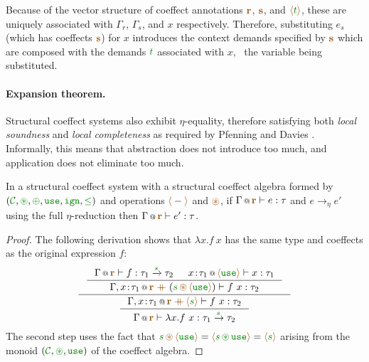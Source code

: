 \noindent
Because of the vector structure of coeffect annotations $\aclrd{\textbf{r}}$,
$\aclrd{\textbf{s}}$, and $\alift{\cclrd{t}}$, these are uniquely associated with $\Gamma_r$,
$\Gamma_s$, and $x$ respectively. Therefore, substituting $e_s$ (which has coeffects
$\aclrd{\textbf{s}}$) for $x$ introduces the context demands specified by $\aclrd{\textbf{s}}$
which are composed with the demands $\cclrd{t}$ associated with $x$, \ie~the variable being
substituted.

\paragraph{Expansion theorem.}
Structural coeffect systems also exhibit $\eta$-equality, therefore satisfying both
\emph{local soundness} and \emph{local completeness} as required by Pfenning and Davies
\cite{logic-modal-reconstruction}. Informally, this means that abstraction does not introduce
too much, and application does not eliminate too much.

\begin{theorem}
In a structural coeffect system with a structural coeffect algebra formed by
$(\C, \cseq, \cpar, \cunit, \czero, \cleq)$ and operations $\alift{-}$ and $\aseq$,
if $\coctx{\Gamma}{\aclrd{\textbf{r}}} \vdash e : \tau$
and $e \rightarrow_{\eta} e'$ using the full $\eta$-reduction then
$\coctx{\Gamma}{\aclrd{\textbf{r}}} \vdash e' : \tau$.
\end{theorem}
\begin{proof}
The following derivation shows that $\lambda x.f~x$ has the same type and coeffects as
the original expression $f$:
\begin{equation*}
\inference
  { \inference
    { \coctx{\Gamma}{\aclrd{\textbf{r}}} \vdash f : \tau_1 \xrightarrow{\cclrd{s}} \tau_2 &
      \coctx{x\!:\!\tau_1}{\alift{\cunit}} \vdash x:\tau_1 }
    { \coctx{\Gamma, x\!:\!\tau_1}{\aclrd{\textbf{r}} \;\atimes\;(\cclrd{s}\,\aseq\,\alift{\cunit}) } \vdash f~x : \tau_2 } }
  { \inference
    { \coctx{\Gamma, x\!:\!\tau_1}{\aclrd{\textbf{r}} \;\atimes\,\alift{\cclrd{s}} } \vdash f~x : \tau_2 }
    { \coctx{\Gamma}{ \aclrd{\textbf{r}} } \vdash \lambda x.f~x : \tau_1 \xrightarrow{\cclrd{s}} \tau_2 } }
\end{equation*}
%
The second step uses the fact that
$\cclrd{s} \,\aseq\, \alift{\cunit} = \alift{\cclrd{s} \,\cseq\, \cunit} = \alift{\cclrd{s}}$
arising from the monoid $(\C, \cseq, \cunit)$ of the coeffect algebra.
\end{proof}

